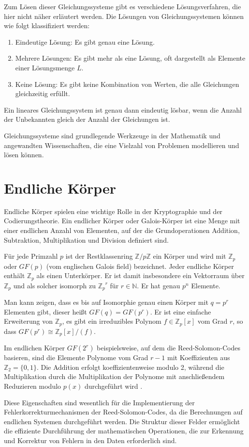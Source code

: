 Zum Lösen dieser Gleichungssysteme gibt es verschiedene Lösungsverfahren, die hier nicht näher erläutert werden.
Die Lösungen von Gleichungssystemen können wie folgt klassifiziert werden:
\begin{enumerate}[noitemsep]
	\item Eindeutige Lösung: Es gibt genau eine Lösung.
	\item Mehrere Lösungen: Es gibt mehr als eine Lösung, oft dargestellt als Elemente einer Lösungsmenge $L$.
	\item Keine Lösung: Es gibt keine Kombination von Werten, die alle Gleichungen gleichzeitig erfüllt.
\end{enumerate}
Ein lineares Gleichungssystem ist genau dann eindeutig lösbar, wenn die Anzahl der Unbekannten gleich der Anzahl der Gleichungen ist.

Gleichungssysteme sind grundlegende Werkzeuge in der Mathematik und angewandten Wissenschaften, die eine Vielzahl von Problemen modellieren und lösen können.

\section{Endliche Körper}\label{sec:galois}

Endliche Körper spielen eine wichtige Rolle in der Kryptographie und der Codierungstheorie.
Ein endlicher Körper oder Galois-Körper ist eine Menge mit einer endlichen Anzahl von Elementen, auf der die Grundoperationen Addition, Subtraktion, Multiplikation und Division definiert sind.

Für jede Primzahl $p$ ist der Restklassenring $\mathbb{Z}/p\mathbb{Z}$  ein Körper und wird mit $\mathbb{Z}_p$ oder $GF(p)$ (vom englischen Galois field) bezeichnet.
Jeder endliche Körper enthält $\mathbb{Z}_p$ als einen Unterkörper.
Er ist damit insbesondere ein Vektorraum über $\mathbb{Z}_p$ und als solcher isomorph zu ${\mathbb{Z}_p}^r$ für $r\in\mathbb{N}$.
Er hat genau $p^n$ Elemente.

Man kann zeigen, dass es bis auf Isomorphie genau einen Körper mit $q=p^r$ Elementen gibt, dieser heißt $GF(q)=GF(p^r)$.
Er ist eine einfache Erweiterung von $\mathbb{Z}_p$, \dahe es gibt ein irreduzibles Polynom $f\in\mathbb{Z}_p[x]$ vom Grad $r$, so dass $GF(p^r)\cong\mathbb{Z}_p[x]/(f)$.

Im endlichen Körper $GF(2^r)$ beispielsweise, auf dem die Reed-Solomon-Codes basieren, sind die Elemente Polynome vom Grad $r-1$ mit Koeffizienten aus $\mathbb{Z}_2=\{0,1\}$.
Die Addition erfolgt koeffizientenweise modulo 2, während die Multiplikation durch die Multiplikation der Polynome mit anschließendem Reduzieren modulo $p(x)$ durchgeführt wird \cite[Kapitel 1.1]{schulz-hankeBCHCodesCombined2023}.

Diese Eigenschaften sind wesentlich für die Implementierung der Fehlerkorrekturmechanismen der Reed-Solomon-Codes, da die Berechnungen auf endlichen Systemen durchgeführt werden.
Die Struktur dieser Felder ermöglicht die effiziente Durchführung der mathematischen Operationen, die zur Erkennung und Korrektur von Fehlern in den Daten erforderlich sind. 
